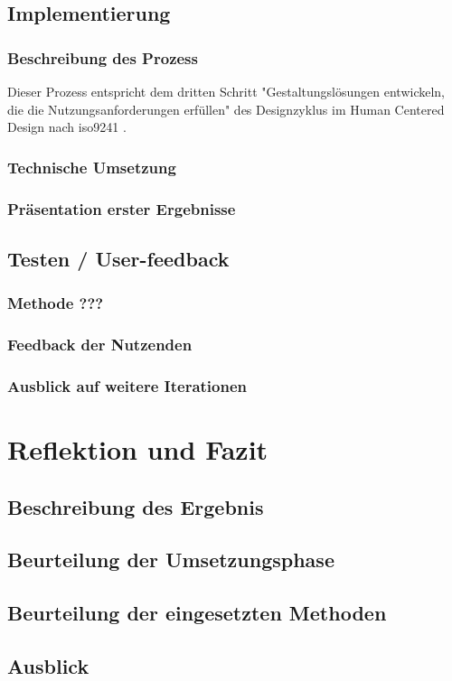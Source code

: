 \documentclass[12pt]{article}
\begin{document}
\subsection{Implementierung}
\subsubsection{Beschreibung des Prozess}
Dieser Prozess entspricht dem dritten Schritt "Gestaltungslösungen entwickeln,
die die Nutzungsanforderungen erfüllen" des Designzyklus im Human Centered
Design nach iso9241 \cite{iso9241}.

\subsubsection{Technische Umsetzung}
\subsubsection{Präsentation erster Ergebnisse}

\subsection{Testen / User-feedback}
\subsubsection{Methode ???}
\subsubsection{Feedback der Nutzenden}
\subsubsection{Ausblick auf weitere Iterationen}

\section{Reflektion und Fazit}
\subsection{Beschreibung des Ergebnis}
\subsection{Beurteilung der Umsetzungsphase}
\subsection{Beurteilung der eingesetzten Methoden}
\subsection{Ausblick}

\newpage



\end{document}
